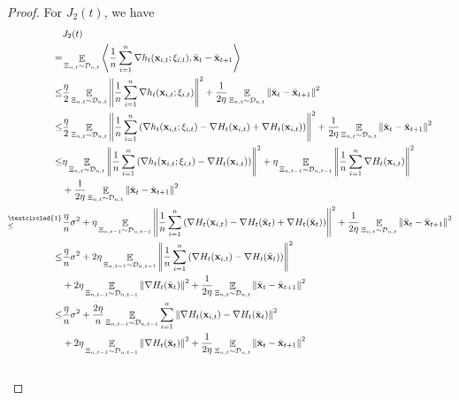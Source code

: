 \documentclass{article}
\begin{document}
\begin{proof}
For $J_2(t)$, we have
\begin{align}
\nonumber
& J_2(t) \\ \nonumber 
= & \EE_{ \Xi_{n,t} \sim \Dcal_{n,t} }\lrangle{\frac{1}{n}\sum_{i=1}^n\nabla h_t(\x_{i,t};\xi_{i,t}), \bar{\x}_t - \bar{\x}_{t+1} } \\ \nonumber
\le & \frac{\eta}{2}\EE_{ \Xi_{n,t} \sim \Dcal_{n,t} } \lrnorm{\frac{1}{n}\sum_{i=1}^n \nabla h_t(\x_{i,t};\xi_{i,t})}^2 + \frac{1}{2\eta} \EE_{ \Xi_{n,t} \sim \Dcal_{n,t} }\lrnorm{ \bar{\x}_t - \bar{\x}_{t+1}}^2  \\ \nonumber
\le & \frac{\eta}{2}\EE_{ \Xi_{n,t} \sim \Dcal_{n,t} }\lrnorm{\frac{1}{n}\sum_{i=1}^n \lrincir{\nabla  h_t(\x_{i,t};\xi_{i,t}) - \nabla H_t(\x_{i,t}) + \nabla H_t(\x_{i,t})} }^2 + \frac{1}{2\eta} \EE_{ \Xi_{n,t} \sim \Dcal_{n,t} }\lrnorm{ \bar{\x}_t - \bar{\x}_{t+1}}^2  \\ \nonumber
\le &  \eta\EE_{ \Xi_{n,t} \sim \Dcal_{n,t} }\lrnorm{\frac{1}{n}\sum_{i=1}^n \lrincir{ \nabla h_t(\x_{i,t};\xi_{i,t}) - \nabla H_t(\x_{i,t}) } }^2 + \eta \EE_{ \Xi_{n,t-1} \sim \Dcal_{n,t-1} }\lrnorm{\frac{1}{n}\sum_{i=1}^n\nabla H_t(\x_{i,t})}^2 \\ \nonumber 
& + \frac{1}{2\eta} \EE_{ \Xi_{n,t} \sim \Dcal_{n,t} }\lrnorm{ \bar{\x}_t - \bar{\x}_{t+1}}^2  \\ \nonumber
\refabovecir{\le}{\textcircled{1}} & \frac{\eta}{n} \sigma^2 + \eta \EE_{ \Xi_{n,t-1} \sim \Dcal_{n,t-1} }\lrnorm{ \frac{1}{n}\sum_{i=1}^n \lrincir{ \nabla H_t(\x_{i,t}) - \nabla H_t(\bar{\x}_t) + \nabla H_t(\bar{\x}_t) } }^2 + \frac{1}{2\eta} \EE_{ \Xi_{n,t} \sim \Dcal_{n,t} }\lrnorm{ \bar{\x}_t - \bar{\x}_{t+1}}^2 \\ \nonumber
\le & \frac{\eta}{n} \sigma^2 + 2\eta \EE_{ \Xi_{n,t-1} \sim \Dcal_{n,t-1} }\lrnorm{\frac{1}{n}\sum_{i=1}^n \lrincir{ \nabla H_t(\x_{i,t}) - \nabla H_t(\bar{\x}_t) } }^2 \\ \nonumber 
& + 2\eta \EE_{ \Xi_{n,t-1} \sim \Dcal_{n,t-1} }\lrnorm{\nabla H_t(\bar{\x}_t)}^2 + \frac{1}{2\eta} \EE_{ \Xi_{n,t} \sim \Dcal_{n,t} }\lrnorm{ \bar{\x}_t - \bar{\x}_{t+1}}^2 \\ \nonumber
\le & \frac{\eta}{n} \sigma^2 + \frac{2\eta}{n} \EE_{ \Xi_{n,t-1} \sim \Dcal_{n,t-1} }\sum_{i=1}^n\lrnorm{ \nabla H_t(\x_{i,t}) - \nabla H_t(\bar{\x}_t)  }^2 \\ \nonumber 
& + 2\eta \EE_{ \Xi_{n,t-1} \sim \Dcal_{n,t-1} }\lrnorm{\nabla H_t(\bar{\x}_t)}^2 + \frac{1}{2\eta} \EE_{ \Xi_{n,t} \sim \Dcal_{n,t} }\lrnorm{ \bar{\x}_t - \bar{\x}_{t+1}}^2 \\ \nonumber

\end{align}
\end{proof}
\end{document}
